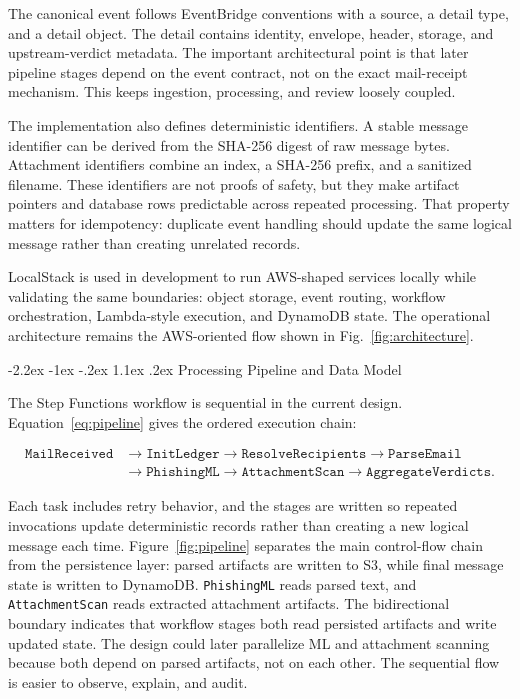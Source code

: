 \documentclass[12pt,a4paper]{article}
\makeatletter
\renewcommand\section{\@startsection {section}{1}{\z@}%
  {-2.2ex \@plus -1ex \@minus -.2ex}%
  {1.1ex \@plus .2ex}%
  {\centering\normalfont\normalsize\bfseries}}
\makeatother
\begin{document}
The canonical event follows EventBridge conventions with a source, a detail type, and a detail object. The detail contains identity, envelope, header, storage, and upstream-verdict metadata. The important architectural point is that later pipeline stages depend on the event contract, not on the exact mail-receipt mechanism. This keeps ingestion, processing, and review loosely coupled.

The implementation also defines deterministic identifiers. A stable message identifier can be derived from the SHA-256 digest of raw message bytes. Attachment identifiers combine an index, a SHA-256 prefix, and a sanitized filename. These identifiers are not proofs of safety, but they make artifact pointers and database rows predictable across repeated processing. That property matters for idempotency: duplicate event handling should update the same logical message rather than creating unrelated records.

LocalStack is used in development to run AWS-shaped services locally while validating the same boundaries: object storage, event routing, workflow orchestration, Lambda-style execution, and DynamoDB state. The operational architecture remains the AWS-oriented flow shown in Fig.~\ref{fig:architecture}.

\section{Processing Pipeline and Data Model}

The Step Functions workflow is sequential in the current design. Equation~\ref{eq:pipeline} gives the ordered execution chain:

\begin{equation}
\begin{aligned}
\texttt{MailReceived} &\rightarrow \texttt{InitLedger}
\rightarrow \texttt{ResolveRecipients}
\rightarrow \texttt{ParseEmail} \\
&\rightarrow \texttt{PhishingML}
\rightarrow \texttt{AttachmentScan}
\rightarrow \texttt{AggregateVerdicts}.
\end{aligned}
\label{eq:pipeline}
\end{equation}

Each task includes retry behavior, and the stages are written so repeated invocations update deterministic records rather than creating a new logical message each time. Figure~\ref{fig:pipeline} separates the main control-flow chain from the persistence layer: parsed artifacts are written to S3, while final message state is written to DynamoDB. \texttt{PhishingML} reads parsed text, and \texttt{AttachmentScan} reads extracted attachment artifacts. The bidirectional boundary indicates that workflow stages both read persisted artifacts and write updated state. The design could later parallelize ML and attachment scanning because both depend on parsed artifacts, not on each other. The sequential flow is easier to observe, explain, and audit.
\end{document}

